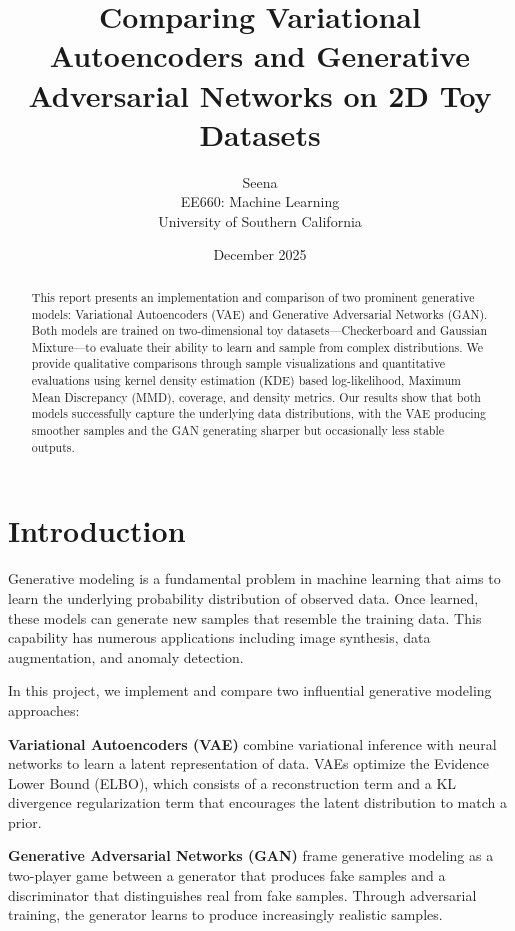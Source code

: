 \documentclass[11pt]{article}
\title{Comparing Variational Autoencoders and Generative Adversarial Networks on 2D Toy Datasets}
\author{Seena\\EE660: Machine Learning\\University of Southern California}
\date{December 2025}
\begin{document}
\maketitle

\begin{abstract}
This report presents an implementation and comparison of two prominent generative models: Variational Autoencoders (VAE) and Generative Adversarial Networks (GAN). Both models are trained on two-dimensional toy datasets—Checkerboard and Gaussian Mixture—to evaluate their ability to learn and sample from complex distributions. We provide qualitative comparisons through sample visualizations and quantitative evaluations using kernel density estimation (KDE) based log-likelihood, Maximum Mean Discrepancy (MMD), coverage, and density metrics. Our results show that both models successfully capture the underlying data distributions, with the VAE producing smoother samples and the GAN generating sharper but occasionally less stable outputs.
\end{abstract}

\section{Introduction}

Generative modeling is a fundamental problem in machine learning that aims to learn the underlying probability distribution of observed data. Once learned, these models can generate new samples that resemble the training data. This capability has numerous applications including image synthesis, data augmentation, and anomaly detection.

In this project, we implement and compare two influential generative modeling approaches:

\textbf{Variational Autoencoders (VAE)} \cite{kingma2014auto} combine variational inference with neural networks to learn a latent representation of data. VAEs optimize the Evidence Lower Bound (ELBO), which consists of a reconstruction term and a KL divergence regularization term that encourages the latent distribution to match a prior.

\textbf{Generative Adversarial Networks (GAN)} \cite{goodfellow2014generative} frame generative modeling as a two-player game between a generator that produces fake samples and a discriminator that distinguishes real from fake samples. Through adversarial training, the generator learns to produce increasingly realistic samples.
\end{document}

